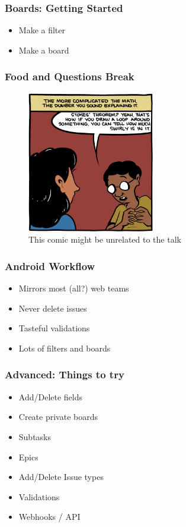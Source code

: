 \documentclass{beamer}
\begin{document}
\begin{frame}[fragile]
  \frametitle{Boards: Getting Started}

  \begin{itemize}
  \item{Make a filter}
  \item{Make a board}
  \end{itemize}
  
\end{frame}

\begin{frame}[fragile]
  \frametitle{Food and Questions Break}
   \begin{figure}[p]
    \centering
    \includegraphics[width=15em]{comic.png}
    \caption{This comic might be unrelated to the talk}
  \end{figure}
  
\end{frame}

\begin{frame}[fragile]
  \frametitle{Android Workflow}

  \begin{itemize}
  \item{Mirrors most (all?) web teams}
  \item{Never delete issues}
  \item{Tasteful validations}
  \item{Lots of filters and boards}
  \end{itemize}

\end{frame}

\begin{frame}[fragile]
  \frametitle{Advanced: Things to try}

  \begin{itemize}
  \item{Add/Delete fields}
  \item{Create private boards}
  \item{Subtasks}
  \item{Epics}
  \item{Add/Delete Issue types}
  \item{Validations}
  \item{Webhooks / API}
  \end{itemize}

\end{frame}
\end{document}
